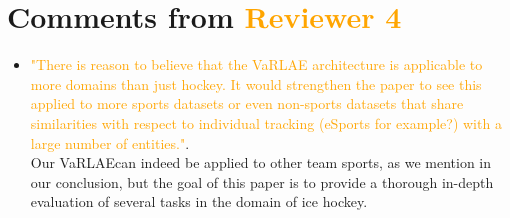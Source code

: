 \documentclass[letterpaper]{article} %
\newcommand{\system}{VaRLAE\;}
\begin{document}
\section{Comments from \textcolor{orange}{Reviewer 4}}
\begin{itemize}
    \item \textcolor{orange}{"There is reason to believe that the VaRLAE architecture is applicable to more domains than just hockey. It would strengthen the paper to see this applied to more sports datasets or even non-sports datasets that share similarities with respect to individual tracking (eSports for example?) with a large number of entities."}. \\
    Our \system can indeed be applied to other team sports, as we mention in our conclusion, but the goal of this paper is to provide a thorough in-depth evaluation of several tasks in the domain of ice hockey. 
\end{itemize}


\end{document}
